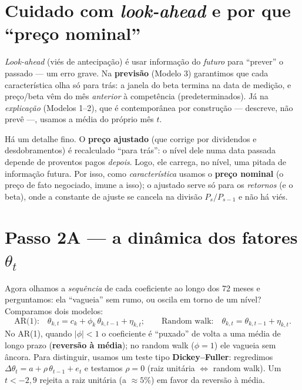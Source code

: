 \documentclass[11pt]{article}
\begin{document}
\section{Cuidado com \emph{look-ahead} e por que ``preço nominal''}

\emph{Look-ahead} (viés de antecipação) é usar informação do \emph{futuro} para
``prever'' o passado --- um erro grave. Na \textbf{previsão} (Modelo 3) garantimos que
cada característica olha só para trás: a janela do beta termina na data de medição, e
preço/beta vêm do mês \emph{anterior} à competência (predeterminados). Já na
\emph{explicação} (Modelos 1--2), que é contemporânea por construção --- descreve, não
prevê ---, usamos a média do próprio mês $t$.

Há um detalhe fino. O \textbf{preço ajustado} (que corrige por dividendos e
desdobramentos) é recalculado ``para trás'': o nível dele numa data passada depende de
proventos pagos \emph{depois}. Logo, ele carrega, no nível, uma pitada de informação
futura. Por isso, como \emph{característica} usamos o \textbf{preço nominal} (o preço
de fato negociado, imune a isso); o ajustado serve só para os \emph{retornos} (e o
beta), onde a constante de ajuste se cancela na divisão $P_s/P_{s-1}$ e não há viés.

\section{Passo 2A --- a dinâmica dos fatores $\theta_t$}

Agora olhamos a \emph{sequência} de cada coeficiente ao longo dos 72 meses e
perguntamos: ela ``vagueia'' sem rumo, ou oscila em torno de um nível? Comparamos dois
modelos:
\begin{equation}
\text{AR(1):}\quad \theta_{k,t}=c_k+\phi_k\,\theta_{k,t-1}+\eta_{k,t};
\qquad
\text{Random walk:}\quad \theta_{k,t}=\theta_{k,t-1}+\eta_{k,t}.
\label{eq:dyn}
\end{equation}
No AR(1), quando $|\phi|<1$ o coeficiente é ``puxado'' de volta a uma média de longo
prazo (\textbf{reversão à média}); no random walk ($\phi=1$) ele vagueia sem âncora.
Para distinguir, usamos um teste tipo \textbf{Dickey--Fuller}: regredimos
$\Delta\theta_t=a+\rho\,\theta_{t-1}+e_t$ e testamos $\rho=0$ (raiz unitária
$\Leftrightarrow$ random walk). Um $t<-2{,}9$ rejeita a raiz unitária (a $\approx5\%$)
em favor da reversão à média.
\end{document}
